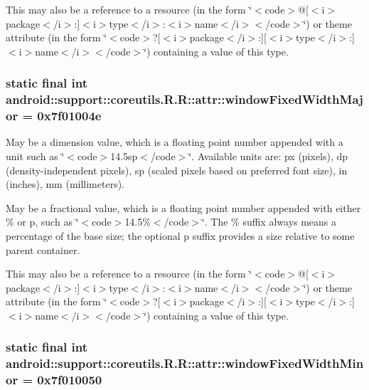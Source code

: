 This may also be a reference to a resource (in the form \char`\"{}$<$code$>$@\mbox{[}$<$i$>$package$<$/i$>$:\mbox{]}$<$i$>$type$<$/i$>$:$<$i$>$name$<$/i$>$$<$/code$>$\char`\"{}) or theme attribute (in the form \char`\"{}$<$code$>$?\mbox{[}$<$i$>$package$<$/i$>$:\mbox{]}\mbox{[}$<$i$>$type$<$/i$>$:\mbox{]}$<$i$>$name$<$/i$>$$<$/code$>$\char`\"{}) containing a value of this type. \hypertarget{classandroid_1_1support_1_1coreutils_1_1_r_1_1attr_a97d85e5e4dd4bdab52973e20638ab59}{
\subsubsection[{windowFixedWidthMajor}]{\setlength{\rightskip}{0pt plus 5cm}static final int android::support::coreutils.R.R::attr::windowFixedWidthMajor = 0x7f01004e}}
\label{classandroid_1_1support_1_1coreutils_1_1_r_1_1attr_a97d85e5e4dd4bdab52973e20638ab59}


May be a dimension value, which is a floating point number appended with a unit such as \char`\"{}$<$code$>$14.5sp$<$/code$>$\char`\"{}. Available units are: px (pixels), dp (density-independent pixels), sp (scaled pixels based on preferred font size), in (inches), mm (millimeters). 

May be a fractional value, which is a floating point number appended with either \% or p, such as \char`\"{}$<$code$>$14.5\%$<$/code$>$\char`\"{}. The \% suffix always means a percentage of the base size; the optional p suffix provides a size relative to some parent container. 

This may also be a reference to a resource (in the form \char`\"{}$<$code$>$@\mbox{[}$<$i$>$package$<$/i$>$:\mbox{]}$<$i$>$type$<$/i$>$:$<$i$>$name$<$/i$>$$<$/code$>$\char`\"{}) or theme attribute (in the form \char`\"{}$<$code$>$?\mbox{[}$<$i$>$package$<$/i$>$:\mbox{]}\mbox{[}$<$i$>$type$<$/i$>$:\mbox{]}$<$i$>$name$<$/i$>$$<$/code$>$\char`\"{}) containing a value of this type. \hypertarget{classandroid_1_1support_1_1coreutils_1_1_r_1_1attr_854d48624e4572ec802a1f8dc353ac65}{
\subsubsection[{windowFixedWidthMinor}]{\setlength{\rightskip}{0pt plus 5cm}static final int android::support::coreutils.R.R::attr::windowFixedWidthMinor = 0x7f010050}}
\label{classandroid_1_1support_1_1coreutils_1_1_r_1_1attr_854d48624e4572ec802a1f8dc353ac65}


